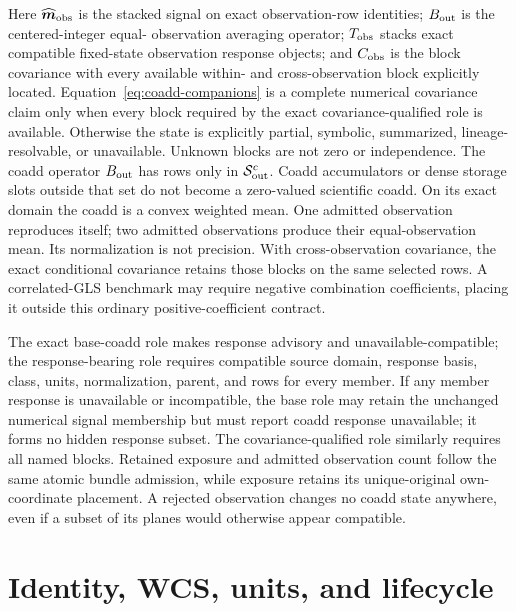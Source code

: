 \documentclass[10pt]{article}
\begin{document}
Here \(\widehat{\boldsymbol m}_{\rm obs}\) is the stacked signal on exact
observation-row identities; \(B_{\rm out}\) is the centered-integer equal-
observation averaging operator; \(T_{\rm obs}\) stacks exact compatible
fixed-state observation response objects; and \(C_{\rm obs}\) is the block covariance with
every available within- and cross-observation block explicitly located.
Equation~\eqref{eq:coadd-companions} is a complete numerical covariance claim
only when every block required by the exact covariance-qualified role is
available. Otherwise the state is explicitly partial, symbolic, summarized,
lineage-resolvable, or unavailable. Unknown blocks are not zero or
independence. The coadd operator \(B_{\rm out}\) has rows only in
\(\mathcal S^c_{\rm out}\). Coadd accumulators or dense storage slots outside
that set do not become a zero-valued scientific coadd. On its exact domain the
coadd is a convex weighted mean. One admitted observation reproduces itself;
two admitted observations produce their equal-observation mean. Its
normalization is not precision. With cross-observation covariance, the exact
conditional covariance retains those blocks on the same selected rows. A
correlated-GLS benchmark may require negative combination coefficients,
placing it outside this ordinary positive-coefficient contract.

The exact base-coadd role makes response advisory and unavailable-compatible;
the response-bearing role requires compatible source domain, response basis,
class, units, normalization, parent, and rows for every member. If any member
response is unavailable or incompatible, the base role may retain the
unchanged numerical signal membership but must report coadd response
unavailable; it forms no hidden response subset. The covariance-qualified
role similarly requires all named blocks. Retained exposure and admitted
observation count follow the same atomic bundle admission, while exposure
retains its unique-original own-coordinate placement.
A rejected observation changes no
coadd state anywhere, even if a subset of its planes would otherwise appear
compatible.

\clearpage
\section{Identity, WCS, units, and lifecycle}
\end{document}
